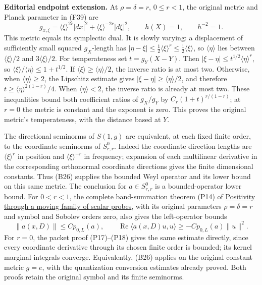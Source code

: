 \documentclass[
  11pt,
]{article}
\begin{document}
\textbf{Editorial endpoint extension.} At \(\rho=\delta=r\),
\(0\le r<1\), the original metric and Planck parameter in (F39) are \[
 g_{x,\xi}=\langle\xi\rangle^{2r}|dx|^2+
                  \langle\xi\rangle^{-2r}|d\xi|^2,
 \qquad h(X)=1,\qquad h^{-2}=1.
 \tag{F51}
\] This metric equals its symplectic dual. It is slowly varying: a
displacement of sufficiently small squared \(g_X\)-length has
\(|\eta-\xi|\le\frac12\langle\xi\rangle^r\le\frac12\langle\xi\rangle\),
so \(\langle\eta\rangle\) lies between \(\langle\xi\rangle/2\) and
\(3\langle\xi\rangle/2\). For temperateness set \(t=g_Y(X-Y)\). Then
\(|\xi-\eta|\le t^{1/2}\langle\eta\rangle^r\), so
\(\langle\xi\rangle/\langle\eta\rangle\le1+t^{1/2}\). If
\(\langle\xi\rangle\ge\langle\eta\rangle/2\), the inverse ratio is at
most two. Otherwise, when \(\langle\eta\rangle\ge2\), the Lipschitz
estimate gives \(|\xi-\eta|\ge\langle\eta\rangle/2\), and therefore
\(t\ge\langle\eta\rangle^{2(1-r)}/4\). When \(\langle\eta\rangle<2\),
the inverse ratio is already at most two. These inequalities bound both
coefficient ratios of \(g_X/g_Y\) by \(C_r(1+t)^{r/(1-r)}\); at \(r=0\)
the metric is constant and the exponent is zero. This proves the
original metric's temperateness, with the distance based at \(Y\).

The directional seminorms of \(S(1,g)\) are equivalent, at each fixed
finite order, to the coordinate seminorms of \(S^0_{r,r}\). Indeed the
coordinate direction lengths are \(\langle\xi\rangle^r\) in position and
\(\langle\xi\rangle^{-r}\) in frequency; expansion of each multilinear
derivative in the corresponding orthonormal coordinate directions gives
the finite dimensional constants. Thus (B26) supplies the bounded Weyl
operator and its lower bound on this same metric. The conclusion for
\(a\in S^0_{r,r}\) is a bounded-operator lower bound. For \(0<r<1\), the
complete band-summation theorem (P14) of
\href{positive-quantization.pdf}{Positivity through a moving family of
scalar probes}, with its original parameters \(\rho=\delta=r\) and
symbol and Sobolev orders zero, also gives the left-operator bounds \[
 \|a(x,D)\|\le C p_{0,L}(a),\qquad
 \operatorname{Re}\langle a(x,D)u,u\rangle
       \ge -C p_{0,L}(a)\|u\|^2.
 \tag{F52}
\] For \(r=0\), the packet proof (P17)--(P18) gives the same estimate
directly, since every coordinate derivative through its chosen finite
order is bounded; its kernel marginal integrals converge. Equivalently,
(B26) applies on the original constant metric \(g=e\), with the
quantization conversion estimates already proved. Both proofs retain the
original symbol and its finite seminorms.
\end{document}
